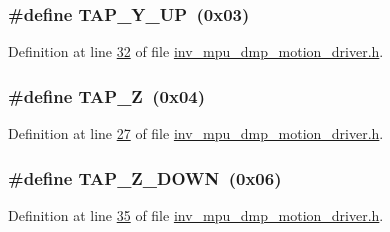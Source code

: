 \subsubsection[{\texorpdfstring{T\+A\+P\+\_\+\+Y\+\_\+\+UP}{TAP_Y_UP}}]{\setlength{\rightskip}{0pt plus 5cm}\#define T\+A\+P\+\_\+\+Y\+\_\+\+UP~(0x03)}\hypertarget{group___d_r_i_v_e_r_s_ga70ea99c21d573b870b91909faf677107}{}\label{group___d_r_i_v_e_r_s_ga70ea99c21d573b870b91909faf677107}


Definition at line \hyperlink{inv__mpu__dmp__motion__driver_8h_source_l00032}{32} of file \hyperlink{inv__mpu__dmp__motion__driver_8h_source}{inv\+\_\+mpu\+\_\+dmp\+\_\+motion\+\_\+driver.\+h}.

\subsubsection[{\texorpdfstring{T\+A\+P\+\_\+Z}{TAP_Z}}]{\setlength{\rightskip}{0pt plus 5cm}\#define T\+A\+P\+\_\+Z~(0x04)}\hypertarget{group___d_r_i_v_e_r_s_gac2949c36d5f4eeb4769fdcf2d99284fd}{}\label{group___d_r_i_v_e_r_s_gac2949c36d5f4eeb4769fdcf2d99284fd}


Definition at line \hyperlink{inv__mpu__dmp__motion__driver_8h_source_l00027}{27} of file \hyperlink{inv__mpu__dmp__motion__driver_8h_source}{inv\+\_\+mpu\+\_\+dmp\+\_\+motion\+\_\+driver.\+h}.

\subsubsection[{\texorpdfstring{T\+A\+P\+\_\+\+Z\+\_\+\+D\+O\+WN}{TAP_Z_DOWN}}]{\setlength{\rightskip}{0pt plus 5cm}\#define T\+A\+P\+\_\+\+Z\+\_\+\+D\+O\+WN~(0x06)}\hypertarget{group___d_r_i_v_e_r_s_ga8f0f8c5db2a60932cfde68ca0b9c2032}{}\label{group___d_r_i_v_e_r_s_ga8f0f8c5db2a60932cfde68ca0b9c2032}


Definition at line \hyperlink{inv__mpu__dmp__motion__driver_8h_source_l00035}{35} of file \hyperlink{inv__mpu__dmp__motion__driver_8h_source}{inv\+\_\+mpu\+\_\+dmp\+\_\+motion\+\_\+driver.\+h}.

